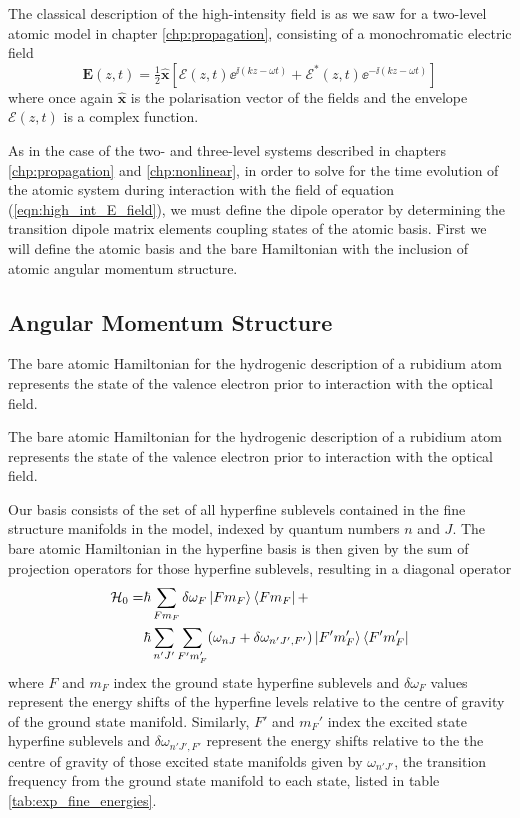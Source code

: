     The classical description of the high-intensity field is as we saw for a
    two-level atomic model in chapter \ref{chp:propagation}, consisting of a monochromatic electric field
    \begin{equation}
      \mathbf{E}(z,t) = \tfrac{1}{2} \mathbf{\hat{x}}  \left[ \mathcal{E}(z,t) 
          \ee^{\ii(k z - \omega t)} + \mathcal{E}^*(z,t) 
          \ee^{-\ii(k z - \omega t)} \right]
      \label{eqn:high_int_E_field}
    \end{equation}
    where once again $\mathbf{\hat{x}}$ is the polarisation vector of the fields
    and the envelope $\mathcal{E}(z,t)$ is a complex function.

    As in the case of the two- and three-level systems described in chapters
    \ref{chp:propagation} and \ref{chp:nonlinear}, in order to solve for the
    time evolution of the atomic system during interaction with the field of
    equation (\ref{eqn:high_int_E_field}), we must define the dipole operator by
    determining the transition dipole matrix elements coupling states of the
    atomic basis. First we will define the atomic basis and the bare Hamiltonian
    with the inclusion of atomic angular momentum structure.

  \subsection{Angular Momentum Structure}  

    The bare atomic Hamiltonian for the hydrogenic description of a rubidium
    atom represents the state of the valence electron prior to interaction with
    the optical field.

    The bare atomic Hamiltonian for the hydrogenic description of a rubidium
    atom represents the state of the valence electron prior to interaction with
    the optical field.

    Our basis consists of the set of all hyperfine sublevels contained in the
    fine structure manifolds in the model, indexed by quantum numbers $n$ and
    $J$. The bare atomic Hamiltonian in the hyperfine basis is then given by the
    sum of projection operators for those hyperfine sublevels, resulting in a
    diagonal operator
    \begin{align}
      \mathcal{H}_0 = &\hbar \sum_{F m_F} \delta \omega_F 
                        \Ket{F m_F} \Bra{F m_F} + \nonumber \\
      &\hbar \sum_{n' J'} \sum_{F' m_F'} (\omega_{n J} + 
        \delta \omega_{n' J', F'}) \Ket{F' m'_F} \Bra{F' m'_F}
    \end{align}
    where $F$ and $m_F$ index the ground state hyperfine sublevels and $\delta
    \omega_F$ values represent the energy shifts of the hyperfine levels
    relative to  the centre of gravity of the ground state manifold. Similarly,
    $F'$ and $m_F'$ index the excited state hyperfine sublevels and $\delta
    \omega_{n' J', F'}$ represent the energy shifts relative to the the centre
    of gravity of those excited state manifolds given by $\omega_{n' J'}$, the
    transition frequency from the ground state manifold to each state, listed in
    table \ref{tab:exp_fine_energies}.

